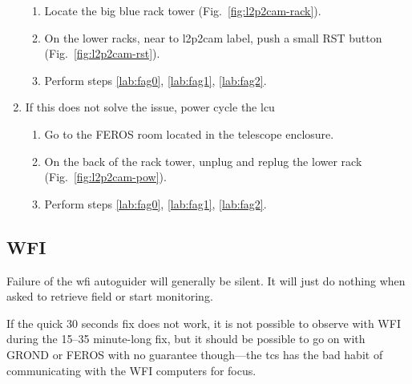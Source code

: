 \documentclass[11pt,fleqn]{book} %
\begin{document}
\begin{enumerate}
\begin{enumerate}
       \item Locate the big blue rack tower (Fig.~\ref{fig:l2p2cam-rack}).
       \item On the lower racks, near to l2p2cam label, push a small RST button (Fig.~\ref{fig:l2p2cam-rst}).
       \item Perform steps \ref{lab:fag0}, \ref{lab:fag1}, \ref{lab:fag2}.
    \end{enumerate}
    \item If this does not solve the issue, power cycle the \gls{lcu}
    \begin{enumerate}
        \item Go to the FEROS room located in the telescope enclosure. 
        \item On the back of the rack tower, unplug and replug the lower rack (Fig.~\ref{fig:l2p2cam-pow}).
        \item Perform steps \ref{lab:fag0}, \ref{lab:fag1}, \ref{lab:fag2}.
    \end{enumerate}
\end{enumerate}

\subsection{WFI}
Failure of the \gls{wfi} autoguider will generally be silent.  It will just do nothing when asked to retrieve field or start monitoring.

If the quick 30 seconds fix does not work, it is not possible to observe with WFI during the 15--35 minute-long fix, but it should be possible to go on with GROND or FEROS with no guarantee though---the \gls{tcs} has the bad habit of communicating with the WFI computers for focus. 
\end{document}
